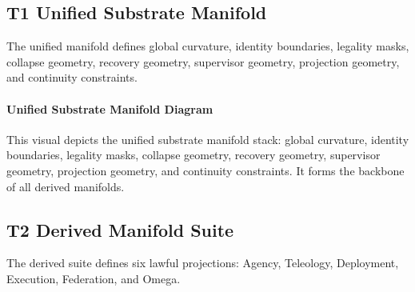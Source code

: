 \subsection{T1 Unified Substrate Manifold}
The unified manifold defines global curvature, identity boundaries, legality
masks, collapse geometry, recovery geometry, supervisor geometry, projection
geometry, and continuity constraints.

\paragraph{Unified Substrate Manifold Diagram}
This visual depicts the unified substrate manifold stack: global curvature,
identity boundaries, legality masks, collapse geometry, recovery geometry,
supervisor geometry, projection geometry, and continuity constraints. It forms
the backbone of all derived manifolds.


\begin{center}
\end{center}


\subsection{T2 Derived Manifold Suite}
The derived suite defines six lawful projections: Agency, Teleology,
Deployment, Execution, Federation, and Omega.

